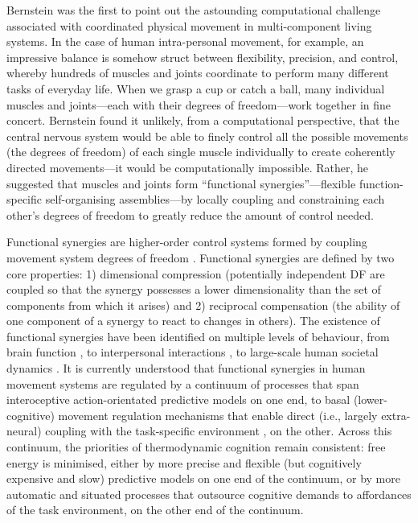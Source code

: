 \begin{CJK}{UTF8}{gbsn}
Bernstein \textcite{Bernstein1967} was the first to point out the astounding computational challenge associated with coordinated physical movement in multi-component living systems.  In the case of human intra-personal movement, for example, an impressive balance is somehow struct between flexibility, precision, and control, whereby hundreds of muscles and joints coordinate to perform many different tasks of everyday life.  When we grasp a cup or catch a ball, many individual muscles and joints---each with their degrees of freedom---work together in fine concert.  Bernstein found it unlikely, from a computational perspective, that the central nervous system would be able to finely control all the possible movements (the degrees of freedom) of each single muscle individually to create coherently directed movements---it would be computationally impossible. Rather, he suggested that muscles and joints form  ``functional synergies''---flexible function-specific self-organising assemblies---by locally coupling and constraining each other’s degrees of freedom to greatly reduce the amount of control needed.

Functional synergies are higher-order control systems formed by coupling movement system degrees of freedom \citep{Turvey1978}.  Functional synergies are defined by two core properties:  1) dimensional compression (potentially independent DF are coupled so that the synergy possesses a lower dimensionality than the set of components from which it arises) and 2) reciprocal compensation (the ability of one component of a synergy to react to changes in others).
The existence of functional synergies have been identified on multiple levels of behaviour, from brain function \citep{Yufik1998,Sengupta2013}, to interpersonal interactions \citep{Kelso2009,Riley2011,Fusaroli2014}, to large-scale human societal dynamics \citep{Nowak2017}.  It is currently understood that functional synergies in human movement systems are regulated by a continuum of processes that span interoceptive action-orientated predictive models on one end, to  basal (lower-cognitive) movement regulation mechanisms that enable direct (i.e., largely extra-neural) coupling with the task-specific environment \citep{Semin2012}, on the other.  Across this continuum, the priorities of thermodynamic cognition remain consistent: free energy is minimised, either by more precise and flexible (but cognitively expensive and slow) predictive models on one end of the continuum, or by more automatic and situated processes that outsource cognitive demands to affordances of the task environment, on the other end of the continuum.


\end{CJK}
